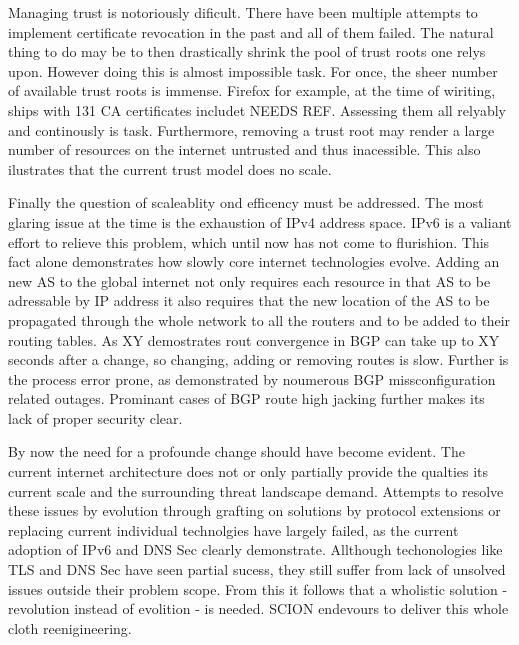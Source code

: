 \documentclass[../eva1_scion.tex]{subfiles}
\begin{document}
Managing trust is notoriously dificult. There have been multiple attempts to implement certificate revocation in the past and all of them failed. The natural thing to do may be to then drastically shrink the pool of trust roots one relys upon. However doing this is almost impossible task. For once, the sheer number of available trust roots is immense. Firefox for example, at the time of wiriting, ships with 131 CA certificates includet NEEDS REF. Assessing them all relyably and continously is task. Furthermore, removing a trust root may render a large number of resources on the internet untrusted and thus inacessible. This also ilustrates that the current trust model does no scale.

Finally the question of scaleablity ond efficency must be addressed. The most glaring issue at the time is the exhaustion of IPv4 address space. IPv6 is a valiant effort to relieve this problem, which until now has not come to flurishion. This fact alone demonstrates how slowly core internet technologies evolve. Adding an new AS to the global internet not only requires each resource in that AS to be adressable by IP address it also requires that the new location of the AS to be propagated through the whole network to all the routers and to be added to their routing tables. As XY demostrates rout convergence in BGP can take up to XY seconds after a change, so changing, adding or removing routes is slow. Further is the process error prone, as demonstrated by noumerous BGP missconfiguration related outages. Prominant cases of BGP route high jacking further makes its lack of proper security clear.

By now the need for a profounde change should have become evident. The current internet architecture does not or only partially provide the qualties its current scale and the surrounding threat landscape demand. Attempts to resolve these issues by evolution through grafting on solutions by protocol extensions or replacing current individual technolgies have largely failed, as the current adoption of IPv6 and DNS Sec clearly demonstrate. Allthough techonologies like TLS and DNS Sec have seen partial sucess, they still suffer from lack of unsolved issues outside their problem scope. From this it follows that a wholistic solution - revolution instead of evolition - is needed. SCION endevours to deliver this whole cloth reenigineering. 
\end{document}
